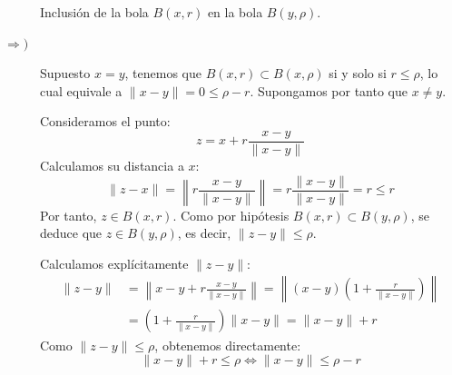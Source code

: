 \begin{ejercicio}
\begin{enumerate}[label={\alph*)}]
\begin{figure}[htbp]
        \caption{Inclusión de la bola $B(x,r)$ en la bola $B(y,\rho)$.}
        \label{fig:inclusion_bolas}
    \end{figure}

    \begin{description}
        \item[$\Longrightarrow)$]
        Supuesto $x = y$, tenemos que $B(x, r) \subset B(x, \rho)$ si y solo si $r \leq \rho$, lo cual equivale a $\|x - y\| = 0 \leq \rho - r$. Supongamos por tanto que $x \neq y$.

        Consideramos el punto:
        \begin{equation*}
            z = x + r \frac{x - y}{\|x - y\|}
        \end{equation*}
        Calculamos su distancia a $x$:
        \begin{equation*}
            \|z - x\| = \left\| r \frac{x - y}{\|x - y\|} \right\| = r \frac{\|x - y\|}{\|x - y\|} = r \leq r
        \end{equation*}
        Por tanto, $z \in B(x, r)$. Como por hipótesis $B(x, r) \subset B(y, \rho)$, se deduce que $z \in B(y, \rho)$, es decir, $\|z - y\| \leq \rho$.

        Calculamos explícitamente $\|z - y\|$:
        \begin{align*}
            \|z - y\| &= \left\| x - y + r \frac{x - y}{\|x - y\|} \right\| = \left\| (x - y)\left(1 + \frac{r}{\|x - y\|}\right) \right\| \\
            &= \left(1 + \frac{r}{\|x - y\|}\right)\|x - y\| = \|x - y\| + r
        \end{align*}
        Como $\|z - y\| \leq \rho$, obtenemos directamente:
        \begin{equation*}
            \|x - y\| + r \leq \rho \iff \|x - y\| \leq \rho - r
        \end{equation*}


\end{description}
\end{enumerate}
\end{ejercicio}

